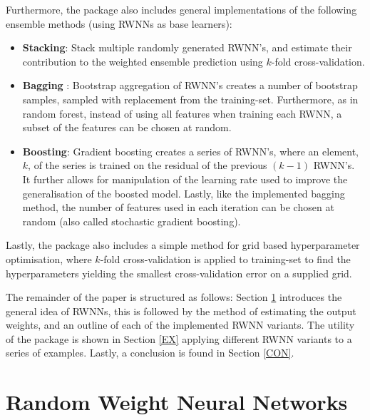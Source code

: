 \documentclass[
]{jss}
\providecommand{\tightlist}{%
  \setlength{\itemsep}{0pt}\setlength{\parskip}{0pt}}
\begin{document}
Furthermore, the  package also includes general
implementations of the following ensemble methods (using RWNNs as base
learners):

\begin{itemize}
\tightlist
\item
  \textbf{Stacking}: Stack multiple randomly generated RWNN's, and
  estimate their contribution to the weighted ensemble prediction using
  \(k\)-fold cross-validation.
\item
  \textbf{Bagging} \citep{Xin2021}: Bootstrap aggregation of RWNN's
  creates a number of bootstrap samples, sampled with replacement from
  the training-set. Furthermore, as in random forest, instead of using
  all features when training each RWNN, a subset of the features can be
  chosen at random.
\item
  \textbf{Boosting}: Gradient boosting creates a series of RWNN's, where
  an element, \(k\), of the series is trained on the residual of the
  previous \((k - 1)\) RWNN's. It further allows for manipulation of the
  learning rate used to improve the generalisation of the boosted model.
  Lastly, like the implemented bagging method, the number of features
  used in each iteration can be chosen at random (also called stochastic
  gradient boosting).
\end{itemize}

Lastly, the  package also includes a simple method for grid
based hyperparameter optimisation, where \(k\)-fold cross-validation is
applied to training-set to find the hyperparameters yielding the
smallest cross-validation error on a supplied grid.

The remainder of the paper is structured as follows: Section \ref{RWNN}
introduces the general idea of RWNNs, this is followed by the method of
estimating the output weights, and an outline of each of the implemented
RWNN variants. The utility of the  package is shown in Section
\ref{EX} applying different RWNN variants to a series of examples.
Lastly, a conclusion is found in Section \ref{CON}.

\hypertarget{RWNN}{%
\section{Random Weight Neural Networks}\label{RWNN}}
\end{document}
